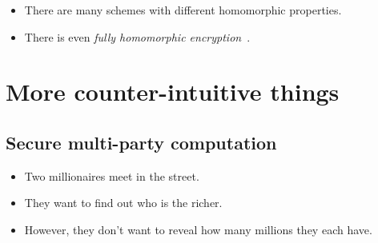 \begin{frame}
  \begin{remark}
    \begin{itemize}
      \item There are many schemes with different homomorphic properties.
      \item There is even \emph{fully homomorphic 
          encryption}~\cite{GentryFullyHomomorphicEncryption}.
    \end{itemize}
  \end{remark}
\end{frame}


\section{More counter-intuitive things}

\subsection{Secure multi-party computation}

\begin{frame}
  \begin{example}
    \begin{itemize}
      \item Two millionaires meet in the street.
      \item They want to find out who is the richer.

        \pause{}

      \item However, they don't want to reveal how many millions they each 
        have.
    \end{itemize}
  \end{example}
\end{frame}

